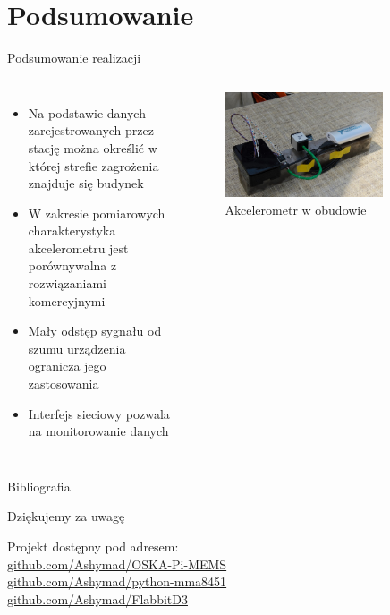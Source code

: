 \documentclass[aspectratio=1610,polish]{beamer} %
\begin{document}
  \section{Podsumowanie}
  \begin{frame}{Podsumowanie realizacji}
    \begin{columns}
      \begin{itemize}
        \item Na podstawie danych zarejestrowanych przez stację można określić w której strefie zagrożenia znajduje się budynek
        \item W zakresie pomiarowych charakterystyka akcelerometru jest porównywalna z rozwiązaniami komercyjnymi
        \item Mały odstęp sygnału od szumu urządzenia ogranicza jego zastosowania
        \item Interfejs sieciowy pozwala na monitorowanie danych
      \end{itemize}
      \begin{figure}
        \includegraphics[width=0.8\textwidth]{bitgraphics/fest.jpg}
        \caption{Akcelerometr w obudowie}
      \end{figure}
    \end{columns} 
  \end{frame}
  \begin{frame}{Bibliografia}
    \nocite{*}
    \printbibliography
  \end{frame}
  \begin{frame}
    \centering
    \vspace*{40pt}

    {\huge Dziękujemy za uwagę}
    \vspace*{20pt}

    Projekt dostępny pod adresem:\\
    \url{github.com/Ashymad/OSKA-Pi-MEMS}\\
    \url{github.com/Ashymad/python-mma8451}\\
    \url{github.com/Ashymad/FlabbitD3}
  \end{frame}
\end{document}
